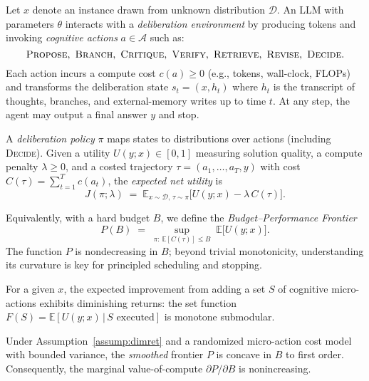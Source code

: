 \documentclass[11pt]{article}
\newcommand{\E}{\mathbb{E}}
\newcommand{\1}{\mathbb{I}}
\begin{document}
Let $x$ denote an instance drawn from unknown distribution $\mathcal{D}$.
An LLM with parameters $\theta$ interacts with a \emph{deliberation environment} by producing tokens and invoking \emph{cognitive actions} $a \in \mathcal{A}$ such as:
\[
\textsc{Propose},\ \textsc{Branch},\ \textsc{Critique},\ \textsc{Verify},\ \textsc{Retrieve},\ \textsc{Revise},\ \textsc{Decide}.
\]
Each action incurs a compute cost $c(a) \ge 0$ (e.g., tokens, wall-clock, FLOPs) and transforms the deliberation state $s_t=(x,h_t)$ where $h_t$ is the transcript of thoughts, branches, and external-memory writes up to time $t$.
At any step, the agent may output a final answer $y$ and stop.

\begin{definition}
A \emph{deliberation policy} $\pi$ maps states to distributions over actions (including \textsc{Decide}).
Given a utility $U(y;x) \in [0,1]$ measuring solution quality, a compute penalty $\lambda \ge 0$, and a costed trajectory $\tau=(a_1,\dots,a_T,y)$ with cost $C(\tau)=\sum_{t=1}^T c(a_t)$, the \emph{expected net utility} is
\begin{equation}
J(\pi;\lambda) \;=\; \E_{x \sim \mathcal{D},\, \tau \sim \pi}\big[ U(y;x) - \lambda\, C(\tau) \big].
\label{eq:net-utility}
\end{equation}
\end{definition}

Equivalently, with a hard budget $B$, we define the \emph{Budget--Performance Frontier}
\begin{equation}
P(B) \;=\; \sup_{\pi:\, \E[C(\tau)] \le B} \; \E\big[ U(y;x) \big].
\label{eq:bpf}
\end{equation}
The function $P$ is nondecreasing in $B$; beyond trivial monotonicity, understanding its curvature is key for principled scheduling and stopping.

\begin{assumption}
\label{assump:dimret}
For a given $x$, the expected improvement from adding a set $S$ of cognitive micro-actions exhibits diminishing returns: the set function
$F(S)=\E[U(y;x)\,|\,S\text{ executed}]$ is monotone submodular.
\end{assumption}

\begin{proposition}
Under Assumption~\ref{assump:dimret} and a randomized micro-action cost model with bounded variance, the \emph{smoothed} frontier $P$ is concave in $B$ to first order. Consequently, the marginal value-of-compute $\partial P / \partial B$ is nonincreasing.
\end{proposition}
\end{document}
